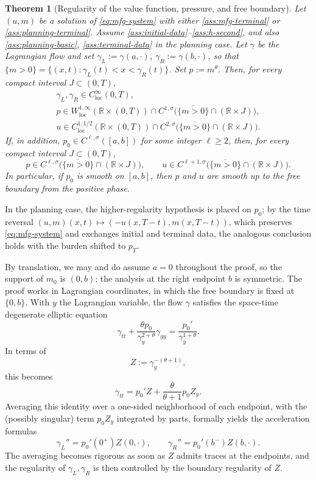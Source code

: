 \documentclass[11pt]{amsart}
\newtheorem{theorem}{Theorem}[section]
\newcommand{\R}{\mathbb R}
\newcommand{\loc}{\mathrm{loc}}
\begin{document}
\begin{theorem}[Regularity of the value function, pressure, and free boundary]
\label{thm:higher-boundary-regularity}
Let \((u,m)\) be a solution of \eqref{eq:mfg-system} with either
\eqref{ass:mfg-terminal} or \eqref{ass:planning-terminal}. Assume
\eqref{ass:initial-data}--\eqref{ass:h-second}, and also
\eqref{ass:planning-basic}, \eqref{ass:terminal-data} in the planning case.
Let \(\gamma\) be the Lagrangian flow and set
\(\gamma_L:=\gamma(a,\cdot)\), \(\gamma_R:=\gamma(b,\cdot)\), so that
\(\{m>0\}=\{(x,t):\gamma_L(t)<x<\gamma_R(t)\}\). Set \(p:=m^\theta\). Then,
for every compact interval \(J\subset(0,T)\),
\[
\begin{gathered}
        \gamma_L,\gamma_R\in C^\infty_{\loc}(0,T),\\
        p\in W^{1,\infty}_{\loc}(\R\times(0,T))
          \cap C^{1,\sigma}\bigl(\overline{\{m>0\}}\cap(\R\times J)\bigr),\\
        u\in C^{1,1/2}_{\loc}(\R\times(0,T))
          \cap C^{2,\sigma}\bigl(\overline{\{m>0\}}\cap(\R\times J)\bigr).
\end{gathered}
\]
If, in addition, \(p_0\in C^{\ell,\sigma}([a,b])\) for some integer
\(\ell\ge2\), then, for every compact interval
\(J\subset(0,T)\),
\[
        p\in
        C^{\ell,\sigma}\bigl(\overline{\{m>0\}}\cap(\R\times J)\bigr),
        \qquad
        u\in
        C^{\ell+1,\sigma}\bigl(\overline{\{m>0\}}\cap(\R\times J)\bigr).
\]
In particular, if \(p_0\) is smooth on \([a,b]\), then \(p\) and \(u\) are
smooth up to the free boundary from the positive phase.
\end{theorem}

In the planning case, the higher-regularity hypothesis is placed on
\(p_0\); by the time reversal \((u,m)(x,t)\mapsto(-u(x,T-t),m(x,T-t))\),
which preserves \eqref{eq:mfg-system} and exchanges initial and terminal
data, the analogous conclusion holds with the burden shifted to \(p_T\).

By translation, we may and do assume \(a=0\) throughout the
proof, so the support of \(m_0\) is \((0,b)\); the analysis at the right
endpoint \(b\) is symmetric.
The proof works in Lagrangian coordinates, in which the free boundary is
fixed at \(\{0,b\}\). With \(y\) the Lagrangian variable, the flow
\(\gamma\) satisfies the space-time degenerate elliptic equation
\begin{equation}
\label{eq:intro-flow}
        \gamma_{tt}
        +\frac{\theta p_0}{\gamma_y^{2+\theta}}\gamma_{yy}
        =
        \frac{p_0'}{\gamma_y^{1+\theta}} .
\end{equation}
In terms of
\[
        Z:=\gamma_y^{-(\theta+1)},
\]
this becomes
\[
        \gamma_{tt}=p_0'Z+\frac{\theta}{\theta+1}p_0Z_y.
\]
Averaging this identity over a one-sided neighborhood of each endpoint, with the
(possibly singular) term \(p_0Z_y\) integrated by parts, formally yields the
acceleration formulas
\[
        \gamma_L''=p_0'(0^+)Z(0,\cdot),
        \qquad
        \gamma_R''=p_0'(b^-)Z(b,\cdot).
\]
The averaging becomes rigorous as soon as \(Z\) admits traces at the
endpoints, and the regularity of \(\gamma_L,\gamma_R\) is then controlled by
the boundary regularity of \(Z\).
\end{document}
